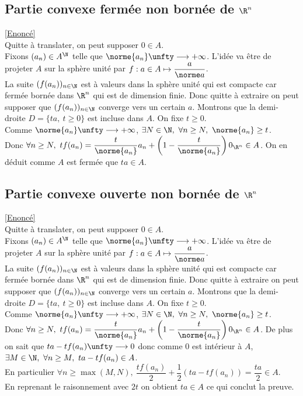 \documentclass{book}
\begin{document}
	\subsection{Partie convexe fermée non bornée de $\R^n$ }
	\label{Partie convexe fermée non bornée de R^n corrigé}
	\textcolor{blue}{\hyperref[Partie convexe fermée non bornée de R^n]{[Enoncé]}}\\
	Quitte à translater, on peut supposer $0\in A$.\\
	Fixons $(a_n)\in A^\N$ telle que $\norme{a_n}\unfty\longrightarrow+\infty$. L'idée va être de projeter $A$ sur la sphère unité par $f:a\in A\mapsto\dfrac{a}{\norme a}$.\\
	La suite $(f(a_n))_{n\in \N}$ est à valeurs dans la sphère unité qui est compacte car fermée bornée dans $\R^n$ qui est de dimension finie. Donc quitte à extraire on peut supposer que $(f(a_n))_{n\in \N}$ converge vers un certain $a$. Montrons que la demi-droite $D=\{ta,\ t\geq 0\}$ est incluse dans $A$. On fixe $t\geq 0$.\\
	Comme $\norme{a_n}\unfty\longrightarrow+\infty$, $\exists N\in \N,\ \forall n\geq N,\ \norme{a_n}\geq t$.\\
	Donc $\forall n\geq N,\ tf(a_n)=\dfrac{t}{\norme{a_n}}a_n+\left(1-\dfrac{t}{\norme{a_n}}\right){0_{\R^n}}\in A$. On en déduit comme $A$ est fermée que $ta\in A$.
	
	\subsection{Partie convexe ouverte non bornée de $\R^n$ }
	\label{Partie convexe ouverte non bornée de R^n corrigé}
	\textcolor{blue}{\hyperref[Partie convexe ouverte non bornée de R^n]{[Enoncé]}}\\
	Quitte à translater, on peut supposer $0\in A$.\\
	Fixons $(a_n)\in A^\N$ telle que $\norme{a_n}\unfty\longrightarrow+\infty$. L'idée va être de projeter $A$ sur la sphère unité par $f:a\in A\mapsto\dfrac{a}{\norme a}$.\\
	La suite $(f(a_n))_{n\in \N}$ est à valeurs dans la sphère unité qui est compacte car fermée bornée dans $\R^n$ qui est de dimension finie. Donc quitte à extraire on peut supposer que $(f(a_n))_{n\in \N}$ converge vers un certain $a$. Montrons que la demi-droite $D=\{ta,\ t\geq 0\}$ est incluse dans $A$. On fixe $t\geq 0$.\\
	Comme $\norme{a_n}\unfty\longrightarrow+\infty$, $\exists N\in \N,\ \forall n\geq N,\ \norme{a_n}\geq t$.\\
	Donc $\forall n\geq N,\ tf(a_n)=\dfrac{t}{\norme{a_n}}a_n+\left(1-\dfrac{t}{\norme{a_n}}\right){0_{\R^n}}\in A$.
	De plus on sait que $ta-tf(a_n)\unfty\longrightarrow 0$ donc comme $0$ est intérieur à $A$, $\exists M\in \N,\ \forall n\geq M,\ ta-tf(a_n)\in A$.\\
	En particulier $\forall n\geq \max(M,N),\ \dfrac{tf(a_n)}{2}+\dfrac{1}{2}(ta-tf(a_n))=\dfrac{ta}{2}\in A$.\\
	En reprenant le raisonnement avec $2t$ on obtient $ta\in A$ ce qui conclut la preuve.
	
\end{document}
